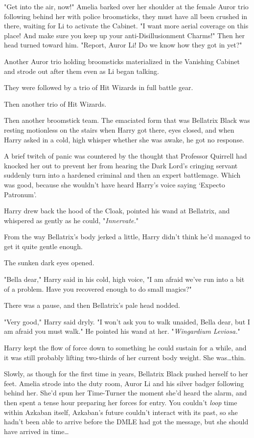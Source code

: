 "Get into the air, now!" Amelia barked over her shoulder at the female Auror
trio following behind her with police broomsticks, they must have all been
crushed in there, waiting for Li to activate the Cabinet. "I want more aerial
coverage on this place! And make sure you keep up your anti-Disillusionment
Charms!" Then her head turned toward him. "Report, Auror Li! Do we know how
they got in yet?"

Another Auror trio holding broomsticks materialized in the Vanishing Cabinet
and strode out after them even as Li began talking.

They were followed by a trio of Hit Wizards in full battle gear.

Then another trio of Hit Wizards.

Then another broomstick team.
\later
The emaciated form that was Bellatrix Black was resting motionless on the
stairs when Harry got there, eyes closed, and when Harry asked in a cold, high
whisper whether she was awake, he got no response.

A brief twitch of panic was countered by the thought that Professor Quirrell
had knocked her out to prevent her from hearing the Dark Lord's cringing
servant suddenly turn into a hardened criminal and then an expert battlemage.
Which was good, because she wouldn't have heard Harry's voice saying `Expecto
Patronum'.

Harry drew back the hood of the Cloak, pointed his wand at Bellatrix, and
whispered as gently as he could, "\emph{Innervate.}"

From the way Bellatrix's body jerked a little, Harry didn't think he'd managed
to get it quite gentle enough.

The sunken dark eyes opened.

"Bella dear," Harry said in his cold, high voice, "I am afraid we've run into a
bit of a problem. Have you recovered enough to do small magics?"

There was a pause, and then Bellatrix's pale head nodded.

"Very good," Harry said dryly. "I won't ask you to walk unaided, Bella dear,
but I am afraid you must walk." He pointed his wand at her. "\emph{Wingardium
Leviosa.}"

Harry kept the flow of force down to something he could sustain for a while,
and it was still probably lifting two-thirds of her current body weight. She
was…thin.

Slowly, as though for the first time in years, Bellatrix Black pushed herself
to her feet.
\later
Amelia strode into the duty room, Auror Li and his silver badger following
behind her. She'd spun her Time-Turner the moment she'd heard the alarm, and
then spent a tense hour preparing her forces for entry. You couldn't
\emph{loop} time within Azkaban itself, Azkaban's future couldn't interact with
its past, so she hadn't been able to arrive before the DMLE had got the
message, but she should have arrived in time…

